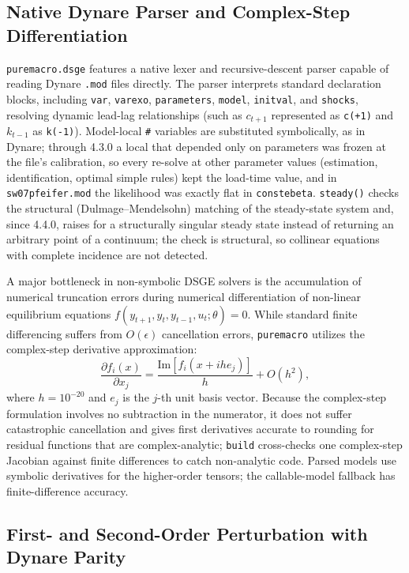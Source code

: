 \documentclass[11pt,letterpaper]{article}
\renewcommand{\_}{\pmunderscore\allowbreak}
\begin{document}
\subsection{Native Dynare Parser and Complex-Step Differentiation}\label{native-dynare-parser-and-complex-step-differentiation}

\texttt{puremacro.dsge} features a native lexer and recursive-descent parser capable of reading Dynare \texttt{.mod} files directly. The parser interprets standard declaration blocks, including \texttt{var}, \texttt{varexo}, \texttt{parameters}, \texttt{model}, \texttt{initval}, and \texttt{shocks}, resolving dynamic lead-lag relationships (such as \(c_{t+1}\) represented as \texttt{c(+1)} and \(k_{t-1}\) as \texttt{k(-1)}). Model-local \texttt{\#} variables are substituted symbolically, as in Dynare; through 4.3.0 a local that depended only on parameters was frozen at the file's calibration, so every re-solve at other parameter values (estimation, identification, optimal simple rules) kept the load-time value, and in \texttt{sw07\_pfeifer.mod} the likelihood was exactly flat in \texttt{constebeta}. \texttt{steady()} checks the structural (Dulmage--Mendelsohn) matching of the steady-state system and, since 4.4.0, raises for a structurally singular steady state instead of returning an arbitrary point of a continuum; the check is structural, so collinear equations with complete incidence are not detected.

A major bottleneck in non-symbolic DSGE solvers is the accumulation of numerical truncation errors during numerical differentiation of non-linear equilibrium equations \(f(y_{t+1}, y_t, y_{t-1}, u_t; \theta) = 0\). While standard finite differencing suffers from \(O(\epsilon)\) cancellation errors, \texttt{puremacro} utilizes the complex-step derivative approximation:
\[\frac{\partial f_i(x)}{\partial x_j} = \frac{\text{Im}\left[ f_i(x + i h e_j) \right]}{h} + O(h^2),\]
where \(h = 10^{-20}\) and \(e_j\) is the \(j\)-th unit basis vector. Because the complex-step formulation involves no subtraction in the numerator, it does not suffer catastrophic cancellation and gives first derivatives accurate to rounding for residual functions that are complex-analytic; \texttt{build} cross-checks one complex-step Jacobian against finite differences to catch non-analytic code. Parsed models use symbolic derivatives for the higher-order tensors; the callable-model fallback has finite-difference accuracy.

\subsection{First- and Second-Order Perturbation with Dynare Parity}\label{first--and-second-order-perturbation-with-dynare-parity}
\end{document}
